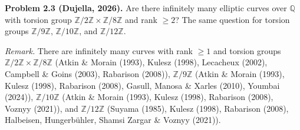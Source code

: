 \textbf{Problem 2.3 (Dujella, 2026).} Are there infinitely many elliptic curves over $\mathbb{Q}$ with torsion group $\mathbb{Z}/2\mathbb{Z}\times\mathbb{Z}/8\mathbb{Z}$ and rank $\geqslant 2$? The same question for torsion groups $\mathbb{Z}/9\mathbb{Z}$, $\mathbb{Z}/10\mathbb{Z}$, and $\mathbb{Z}/12\mathbb{Z}$.

\medskip

\textit{Remark.} There are infinitely many curves with rank $\geqslant 1$ and torsion groups $\mathbb{Z}/2\mathbb{Z}\times\mathbb{Z}/8\mathbb{Z}$ (Atkin \& Morain (1993), Kulesz (1998), Lecacheux (2002), Campbell \& Goins (2003), Rabarison (2008)), $\mathbb{Z}/9\mathbb{Z}$ (Atkin \& Morain (1993), Kulesz (1998), Rabarison (2008), Gasull, Manosa \& Xarles (2010), Youmbai (2024)), $\mathbb{Z}/10\mathbb{Z}$ (Atkin \& Morain (1993), Kulesz (1998), Rabarison (2008), Voznyy (2021)), and $\mathbb{Z}/12\mathbb{Z}$ (Suyama (1985), Kulesz (1998), Rabarison (2008), Halbeisen, Hungerbühler, Shamsi Zargar \& Voznyy (2021)).
